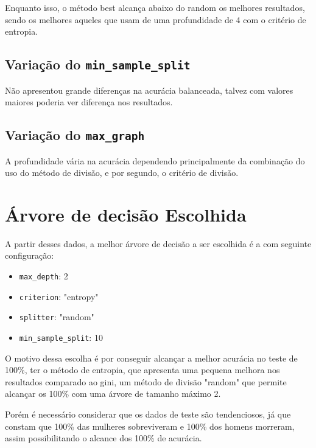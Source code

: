 \documentclass[a4paper,11pt]{article}
\begin{document}
Enquanto isso, o método best alcança abaixo do random os melhores resultados, sendo os melhores aqueles que usam de uma profundidade de 4 com o critério de entropia.

\subsection{Variação do \texttt{min\_sample\_split}}

Não apresentou grande diferenças na acurácia balanceada, talvez com valores maiores poderia ver diferença nos resultados.


\subsection{Variação do \texttt{max\_graph}}

A profundidade vária na acurácia dependendo principalmente da combinação do uso do método de divisão, e por segundo, o critério de divisão.

\section{Árvore de decisão Escolhida}

A partir desses dados, a melhor árvore de decisão a ser escolhida é a com seguinte configuração:

\begin{itemize}[label=--]
    \item \texttt{max\_depth}: 2
    \item \texttt{criterion}: "entropy"
    \item \texttt{splitter}: "random"
    \item \texttt{min\_sample\_split}: 10
\end{itemize}

O motivo dessa escolha é por conseguir alcançar a melhor acurácia no teste de 100\%, ter o método de entropia, que apresenta uma pequena melhora nos resultados comparado ao gini, um método de divisão "random" que permite alcançar os 100\% com uma árvore de tamanho máximo 2.

Porém é necessário considerar que os dados de teste são tendenciosos, já que constam que 100\% das mulheres sobreviveram e 100\% dos homens morreram, assim possibilitando o alcance dos 100\% de acurácia.
\end{document}
